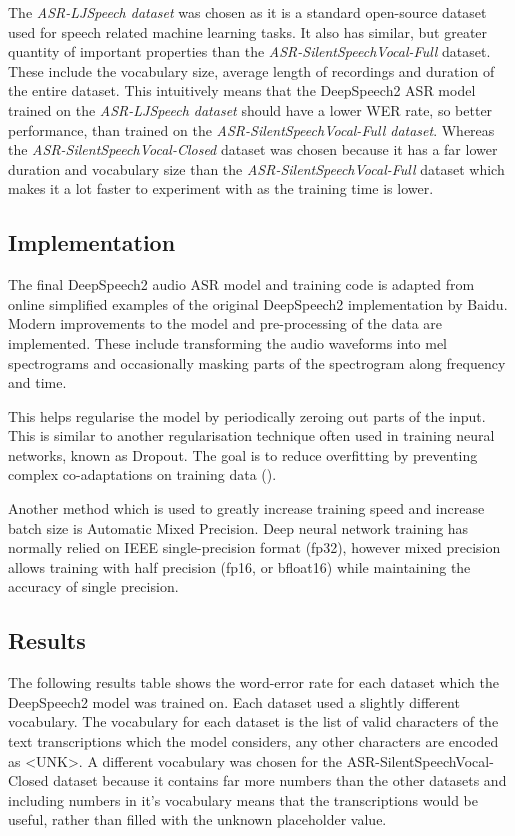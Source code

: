The \textit{ASR-LJSpeech dataset} was chosen as it is a standard open-source dataset
used for speech related machine learning tasks. It also has similar, but greater
quantity of important properties than the \textit{ASR-SilentSpeechVocal-Full} dataset.
These include the vocabulary size,
average length of recordings and duration of the entire dataset. This intuitively
means that the DeepSpeech2 ASR model trained on the \textit{ASR-LJSpeech dataset} should
have a lower WER rate, so better performance, than trained on
the \textit{ASR-SilentSpeechVocal-Full dataset}.
Whereas the \textit{ASR-SilentSpeechVocal-Closed} dataset was chosen because it has
a far lower duration and vocabulary size than the \textit{ASR-SilentSpeechVocal-Full}
dataset which makes it a lot faster to experiment with as the training time is
lower.

\subsection{Implementation}

The final DeepSpeech2 audio ASR model and training code is adapted from
online simplified examples of the original DeepSpeech2 implementation by Baidu.
Modern improvements to the model and pre-processing of the data are implemented.
These include transforming the audio waveforms into mel spectrograms and
occasionally masking parts of the spectrogram along frequency and time.

This
helps regularise the model by periodically zeroing out parts of the input.
This is similar to another regularisation technique often used in training
neural networks, known as Dropout. The goal is to reduce overfitting by preventing
complex co-adaptations on training data
(\cite{pmlr-v28-wan13}).

Another method which is used to greatly increase training speed and increase
batch size is Automatic Mixed Precision. Deep neural network training has
normally relied on IEEE single-precision format (fp32), however mixed
precision allows training with half precision (fp16, or bfloat16) while
maintaining the accuracy of single precision.

\subsection{Results}

The following results table shows the word-error rate for each dataset
which the DeepSpeech2 model was trained on. Each dataset used a slightly
different vocabulary. The vocabulary for each dataset
is the list of valid characters
of the text transcriptions which the model considers, any other characters
are encoded as \textless UNK\textgreater. A different vocabulary was chosen for the
ASR-SilentSpeechVocal-Closed dataset because it contains far more numbers
than the other datasets and including numbers in it's vocabulary means
that the transcriptions would be useful, rather than filled with the
unknown placeholder value.

